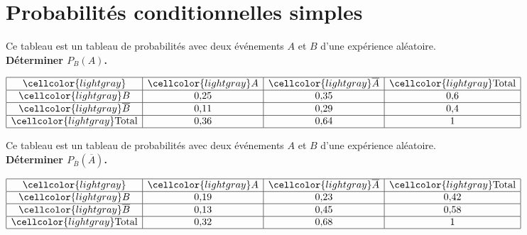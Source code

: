 \documentclass[11pt]{article}
\begin{document}
\section{Probabilités conditionnelles simples}

\begin{exercice}
  \begin{multicols}{2}
    Ce tableau est un tableau de probabilités avec deux événements $A$
    et
    $B$  d’une expérience aléatoire.\\
    \textbf{Déterminer $P_B(A)$.}
    \columnnbreak

    \phantom{00000000000} $\renewcommand{\arraystretch}{1}
    \begin{array}{|c|c|c|c|}
      \hline
      \cellcolor{lightgray}  & \cellcolor{lightgray} A & \cellcolor{lightgray} \overline{A} & \cellcolor{lightgray} \text{Total}\\
      \hline
      \cellcolor{lightgray} B & 0{,}25 & 0{,}35 & 0{,}6\\
      \hline
      \cellcolor{lightgray} \overline{B} & 0{,}11 & 0{,}29 & 0{,}4\\
      \hline
      \cellcolor{lightgray} \text{Total} & 0{,}36 & 0{,}64 & 1\\
      \hline
    \end{array}
    \renewcommand{\arraystretch}{1}$
  \end{multicols}
\end{exercice}

\begin{exercice}
  \begin{multicols}{2}
    Ce tableau est un tableau de probabilités avec deux événements $A$
    et
    $B$  d’une expérience aléatoire.\\
     \textbf{Déterminer $P_{\overline{B}}(\overline{A})$.}
     \columnnbreak

     \phantom{00000000000}
    $\renewcommand{\arraystretch}{1}
    \begin{array}{|c|c|c|c|}
      \hline
      \cellcolor{lightgray}  & \cellcolor{lightgray} A & \cellcolor{lightgray} \overline{A} & \cellcolor{lightgray} \text{Total}\\
      \hline
      \cellcolor{lightgray} B & 0{,}19 & 0{,}23 & 0{,}42\\
      \hline
      \cellcolor{lightgray} \overline{B} & 0{,}13 & 0{,}45 & 0{,}58\\
      \hline
      \cellcolor{lightgray} \text{Total} & 0{,}32 & 0{,}68 & 1\\
      \hline
    \end{array}
    \renewcommand{\arraystretch}{1}$
  \end{multicols}
\end{exercice}
\end{document}
